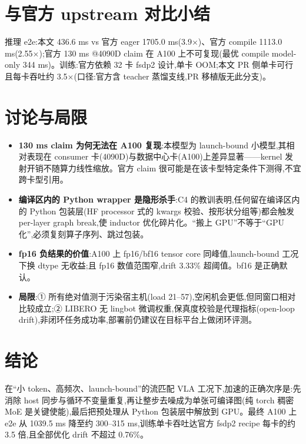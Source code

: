 \documentclass[11pt]{ctexart}
\begin{document}
\section{与官方 upstream 对比小结}
推理 e2e:本文 436.6 ms vs 官方 eager 1705.0 ms(3.9$\times$)、官方 compile 1113.0 ms(2.55$\times$);官方 130 ms @4090D claim 在 A100 上不可复现(最优 compile model-only 344 ms)。训练:官方依赖 32 卡 fsdp2 设计,单卡 OOM;本文 PR 侧单卡可行且每卡吞吐约 3.5$\times$(口径:官方含 teacher 蒸馏支线,PR 移植版无此分支)。

\section{讨论与局限}
\begin{itemize}
\item \textbf{130 ms claim 为何无法在 A100 复现}:本模型为 launch-bound 小模型,其相对表现在 consumer 卡(4090D)与数据中心卡(A100)上差异显著——kernel 发射开销不随算力线性缩放。官方 claim 很可能是在该卡型特定条件下测得,不宜跨卡型引用。
\item \textbf{编译区内的 Python wrapper 是隐形杀手}:C4 的教训表明,任何留在编译区内的 Python 包装层(HF processor 式的 kwargs 校验、按形状分组等)都会触发 per-layer graph break,使 inductor 优化碎片化。``搬上 GPU''不等于``GPU 化'',必须复刻算子序列、跳过包装。
\item \textbf{fp16 负结果的价值}:A100 上 fp16/bf16 tensor core 同峰值,launch-bound 工况下换 dtype 无收益;且 fp16 数值范围窄,drift 3.33\% 超阈值。bf16 是正确默认。
\item \textbf{局限}:① 所有绝对值测于污染宿主机(load 21--57),空闲机会更低,但同窗口相对比较成立;② LIBERO 无 lingbot 微调权重,保真度校验是代理指标(open-loop drift),非闭环任务成功率,部署前仍建议在目标平台上做闭环评测。
\end{itemize}

\section{结论}
在``小 token、高频次、launch-bound''的流匹配 VLA 工况下,加速的正确次序是:先消除 host 同步与循环不变量重复,再让整步去噪成为单张可编译图(纯 torch 稠密 MoE 是关键使能),最后把预处理从 Python 包装层中解放到 GPU。最终 A100 上 e2e 从 1039.5 ms 降至约 300--315 ms,训练单卡吞吐达官方 fsdp2 recipe 每卡的约 3.5 倍,且全部优化 drift 不超过 0.76\%。
\end{document}
